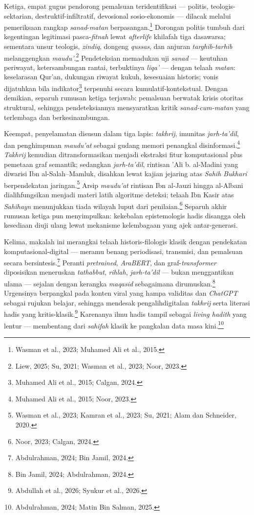 Ketiga, empat gugus pendorong pemalsuan teridentifikasi --- politis, teologis-sektarian, destruktif-infiltratif, devosional sosio-ekonomis --- dilacak melalui pemeriksaan rangkap \textit{sanad}-\textit{matan} berpasangan.\footnote{Wasman et al., 2023; Muhamed Ali et al., 2015.} Dorongan politis tumbuh dari kegentingan legitimasi pasca-\textit{fitnah} lewat \textit{afterlife} khilafah tiga dasawarsa; sementara unsur teologis, \textit{zindiq}, dongeng \textit{qussas}, dan anjuran \textit{targhib-tarhib} melanggengkan \textit{maudu'}.\footnote{Liew, 2025; Su, 2021; Wasman et al., 2023; Noor, 2023.} Pendeteksian memadukan uji \textit{sanad} --- keutuhan periwayat, ketersambungan rantai, terbuktinya \textit{liqa'} --- dengan telaah \textit{matan}: keselarasan Qur'an, dukungan riwayat kukuh, kesesuaian historis; vonis dijatuhkan bila indikator\footnote{Muhamed Ali et al., 2015; Calgan, 2024.} terpenuhi secara kumulatif-kontekstual. Dengan demikian, separuh rumusan ketiga terjawab: pemalsuan berwatak krisis otoritas struktural, sehingga pendeteksiannya mensyaratkan kritik \textit{sanad-cum-matan} yang terlembaga dan berkesinambungan.

Keempat, penyelamatan disusun dalam tiga lapis: \textit{takhrij}, imunitas \textit{jarh-ta'dil}, dan penghimpunan \textit{maudu'at} sebagai gudang memori penangkal disinformasi.\footnote{Muhamed Ali et al., 2015; Noor, 2023.} \textit{Takhrij} kemudian ditransformasikan menjadi ekstraksi fitur komputasional plus pemetaan graf semantik; sedangkan \textit{jarh-ta'dil}, rintisan 'Ali b. al-Madini yang diwarisi Ibn al-Salah--Mamluk, disahkan lewat kajian jejaring atas \textit{Sahih Bukhari} berpendekatan jaringan.\footnote{Wasman et al., 2023; Kamran et al., 2023; Su, 2021; Alam dan Schneider, 2020.} Arsip \textit{maudu'at} rintisan Ibn al-Jauzi hingga al-Albani dialihfungsikan menjadi materi latih algoritme deteksi; telaah Ibn Kasir atas \textit{Sahihayn} menunjukkan tiada wilayah luput dari penilaian.\footnote{Noor, 2023; Calgan, 2024.} Separuh akhir rumusan ketiga pun menyimpulkan: kekebalan epistemologis hadis disangga oleh kesediaan diuji ulang lewat mekanisme kelembagaan yang ajek antar-generasi.

Kelima, makalah ini merangkai telaah historis-filologis klasik dengan pendekatan komputasional-digital --- meramu benang periodisasi, transmisi, dan pemalsuan secara bersintesis.\footnote{Abdulrahman, 2024; Bin Jamil, 2024.} Peranti \textit{pretrained}, \textit{AraBERT}, dan graf-\textit{transformer} diposisikan meneruskan \textit{tathabbut}, \textit{rihlah}, \textit{jarh-ta'dil} --- bukan menggantikan ulama --- sejalan dengan kerangka \textit{maqasid} sebagaimana dirumuskan.\footnote{Bin Jamil, 2024; Abdulrahman, 2024.} Urgensinya berpangkal pada konten viral yang hampa validitas dan \textit{ChatGPT} sebagai rujukan belajar, sehingga mendesak pengalihdigitalan \textit{takhrij} serta literasi hadis yang kritis-klasik.\footnote{Abdullah et al., 2026; Syukur et al., 2026.} Karenanya ilmu hadis tampil sebagai \textit{living hadith} yang lentur --- membentang dari \textit{sahifah} klasik ke pangkalan data masa kini.\footnote{Abdulrahman, 2024; Matin Bin Salman, 2025.}

